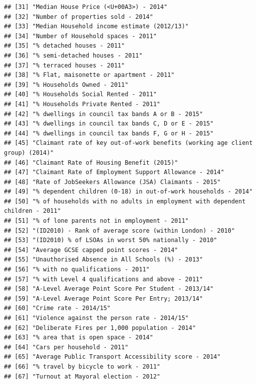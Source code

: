 \documentclass[]{book}
\begin{document}
\begin{verbatim}
## [31] "Median House Price (<U+00A3>) - 2014"                                       
## [32] "Number of properties sold - 2014"                                           
## [33] "Median Household income estimate (2012/13)"                                 
## [34] "Number of Household spaces - 2011"                                          
## [35] "% detached houses - 2011"                                                   
## [36] "% semi-detached houses - 2011"                                              
## [37] "% terraced houses - 2011"                                                   
## [38] "% Flat, maisonette or apartment - 2011"                                     
## [39] "% Households Owned - 2011"                                                  
## [40] "% Households Social Rented - 2011"                                          
## [41] "% Households Private Rented - 2011"                                         
## [42] "% dwellings in council tax bands A or B - 2015"                             
## [43] "% dwellings in council tax bands C, D or E - 2015"                          
## [44] "% dwellings in council tax bands F, G or H - 2015"                          
## [45] "Claimant rate of key out-of-work benefits (working age client group) (2014)"
## [46] "Claimant Rate of Housing Benefit (2015)"                                    
## [47] "Claimant Rate of Employment Support Allowance - 2014"                       
## [48] "Rate of JobSeekers Allowance (JSA) Claimants - 2015"                        
## [49] "% dependent children (0-18) in out-of-work households - 2014"               
## [50] "% of households with no adults in employment with dependent children - 2011"
## [51] "% of lone parents not in employment - 2011"                                 
## [52] "(ID2010) - Rank of average score (within London) - 2010"                    
## [53] "(ID2010) % of LSOAs in worst 50% nationally - 2010"                         
## [54] "Average GCSE capped point scores - 2014"                                    
## [55] "Unauthorised Absence in All Schools (%) - 2013"                             
## [56] "% with no qualifications - 2011"                                            
## [57] "% with Level 4 qualifications and above - 2011"                             
## [58] "A-Level Average Point Score Per Student - 2013/14"                          
## [59] "A-Level Average Point Score Per Entry; 2013/14"                             
## [60] "Crime rate - 2014/15"                                                       
## [61] "Violence against the person rate - 2014/15"                                 
## [62] "Deliberate Fires per 1,000 population - 2014"                               
## [63] "% area that is open space - 2014"                                           
## [64] "Cars per household - 2011"                                                  
## [65] "Average Public Transport Accessibility score - 2014"                        
## [66] "% travel by bicycle to work - 2011"                                         
## [67] "Turnout at Mayoral election - 2012"
\end{verbatim}
\end{document}
